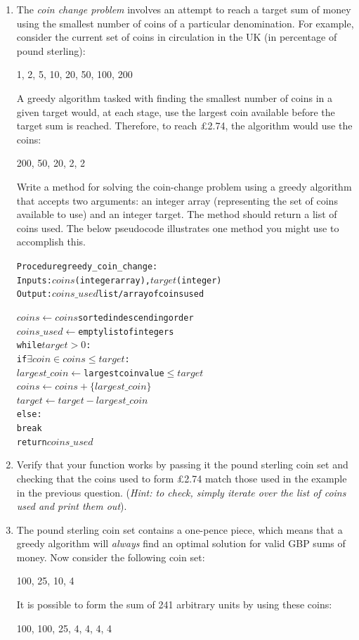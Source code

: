 \documentclass[11pt,a4paper]{report}
\begin{document}
\begin{enumerate}

\item The \textit{coin change problem} involves an attempt to reach a target sum of money using the smallest number of coins of a particular denomination. For example, consider the current set of coins in circulation in the UK (in percentage of pound sterling):
    \begin{center}
       1, 2, 5, 10, 20, 50, 100, 200
    \end{center}

    A greedy algorithm tasked with finding the smallest number of coins in a given target would, at each stage, use the largest coin available before the target sum is reached. Therefore, to reach \pounds2.74, the algorithm would use the coins:
    \begin{center}
        200, 50, 20, 2, 2
    \end{center}

    Write a method for solving the coin-change problem using a greedy algorithm that accepts two arguments: an integer array (representing the set of coins available to use) and an integer target. The method should return a list of coins used. The below pseudocode illustrates one method you might use to accomplish this.

\begin{alltt}
Procedure greedy\_coin\_change:
    Inputs: \(coins\) (integer array), \(target\) (integer)
    Output: \(coins\_used\) list/array of coins used
    
    \(coins \gets coins\) sorted in descending order
    \(coins\_used \gets\) empty list of integers
    while \(target > 0\):
        if \(\exists coin \in coins \leq target\):
            \(largest\_coin \gets\) largest coin value \(\leq target\)
            \(coins \gets coins + \{largest\_coin\}\)
            \(target \gets target - largest\_coin\)
        else:
            break
    return \(coins\_used\)
\end{alltt}

\item Verify that your function works by passing it the pound sterling coin set and checking that the coins used to form \pounds2.74 match those used in the example in the previous question. (\textit{Hint: to check, simply iterate over the list of coins used and print them out}).
        
\item The pound sterling coin set contains a one-pence piece, which means that a greedy algorithm will \textit{always} find an optimal solution for valid GBP sums of money. Now consider the following coin set:
    \begin{center}
        100, 25, 10, 4
    \end{center}
    It is possible to form the sum of 241 arbitrary units by using these coins:
    \begin{center}
        100, 100, 25, 4, 4, 4, 4
    \end{center} 
    

\end{enumerate}
\end{document}
